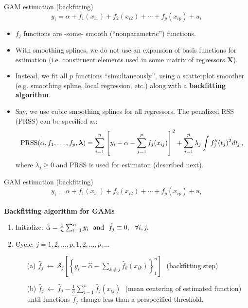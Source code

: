 \documentclass{beamer}
\begin{document}
\begin{frame}{GAM estimation (backfitting)}
\vspace{-0.3cm}
$$ y_i = \alpha + f_1(x_{i1}) + f_2(x_{i2}) + \cdots + f_p(x_{ip}) + u_i$$
\vspace{-0.3cm}
\begin{itemize}
    \item $f_j$ functions are -some- smooth (``nonparametric'') functions.
    \smallskip
    \item With smoothing splines, we do not use an expansion of basis functions for estimation (i.e. constituent elements used in some matrix of regressors $\bm{X}$).
    \smallskip
    \item Instead, we fit all $p$ functions ``simultaneously'', using a scatterplot smoother (e.g. smoothing spline, local regression, etc.) along with a \textbf{backfitting algorithm}.
    \smallskip
    \item Say, we use cubic smoothing splines for all regressors. The penalized RSS (PRSS) can be specified as:
    \small{$$\textnormal{PRSS}(\alpha,f_1,\dots,f_p,\bm{\lambda}) = \sum_{i=1}^n \left[y_i - \alpha - \sum_{j=1}^p f_j(x_{ij}) \right]^2 + \sum_{j=1}^p \lambda_j \int f_j''(t_j)^2 \textit{dt}_j\,,$$}
    where $\lambda_j \geq 0$ and PRSS is used for estimaton (described next).
\end{itemize}
\end{frame}
\begin{frame}{GAM estimation (backfitting)}
\vspace{-0.3cm}
$$ y_i = \alpha + f_1(x_{i1}) + f_2(x_{i2}) + \cdots + f_p(x_{ip}) + u_i$$\\
\bigskip
\textbf{Backfitting algorithm for GAMs}\\ \medskip
\begin{enumerate}
    \item Initialize: $\hat{\alpha}=\frac{1}{n} \sum_{i=1}^n y_i~~\textnormal{and}~~\hat{f}_j \equiv 0,~~\forall i,j.$
    \bigskip
    \item Cycle: $j = 1,2,\dots,p,1,2,\dots,p,\dots$
    \bigskip
    \begin{itemize}
        \item[(a)] $\hat{f}_j~\leftarrow ~ \mathcal{S}_j \left[ \left\lbrace y_i - \hat{\alpha} - \sum_{k \neq j} \hat{f}_k (x_{ik}) \right\rbrace_1^n \right]~~~$(backfitting step)
        \bigskip
        \item[(b)] $\hat{f}_j~\leftarrow ~ \hat{f}_j - \frac{1}{n} \sum_{i-1}^n \hat{f}_j (x_{ij}) ~~~$(mean centering of estimated function)\\
        \bigskip
        until functions $\hat{f}_j$ change less than a prespecified threshold.
    \end{itemize}
\end{enumerate}
\end{frame}
\end{document}
